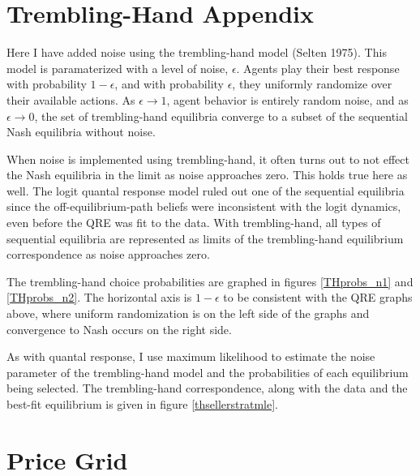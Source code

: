 \documentclass[12pt]{article}
\begin{document}


\section{Trembling-Hand Appendix}

Here I have added noise using the trembling-hand model (Selten 1975). This model is paramaterized with a level of noise, $\epsilon$. Agents play their best response with probability $1 - \epsilon$, and with probability $\epsilon$, they uniformly randomize over their available actions. As $\epsilon \to 1$, agent behavior is entirely random noise, and as $\epsilon \to 0$, the set of trembling-hand equilibria converge to a subset of the sequential Nash equilibria without noise. 

When noise is implemented using trembling-hand, it often turns out to not effect the Nash equilibria in the limit as noise approaches zero. This holds true here as well. The logit quantal response model ruled out one of the sequential equilibria since the off-equilibrium-path beliefs were inconsistent with the logit dynamics, even before the QRE was fit to the data. With trembling-hand, all types of sequential equilibria are represented as limits of the trembling-hand equilibrium correspondence as noise approaches zero.

The trembling-hand choice probabilities are graphed in figures \ref{THprobs_n1} and \ref{THprobs_n2}. The horizontal axis is $1 - \epsilon$ to be consistent with the QRE graphs above, where uniform randomization is on the left side of the graphs and convergence to Nash occurs on the right side. 




As with quantal response, I use maximum likelihood to estimate the noise parameter of the trembling-hand model and the probabilities of each equilibrium being selected. The trembling-hand correspondence, along with the data and the best-fit equilibrium is given in figure \ref{thsellerstratmle}. 






\section{Price Grid}
\end{document}

